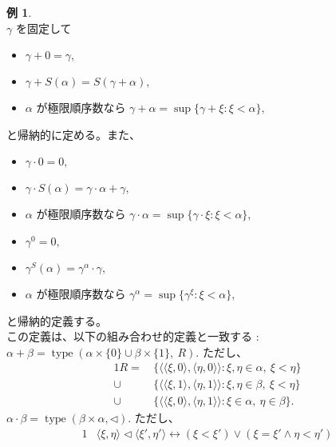 \documentclass{jsarticle}
\theoremstyle{definition}
\newtheorem{example}{例}[section]
\begin{document}
    \begin{example} \ \\
        $\gamma$ を固定して
        \begin{itemize}
        \item $\gamma + 0 = \gamma,$
        \item $\gamma + S(\alpha) = S(\gamma + \alpha),$
        \item $\alpha$ が極限順序数なら $\gamma + \alpha = \sup \{\gamma + \xi : \xi < \alpha\},$
        \end{itemize}
        と帰納的に定める。また、
        \begin{itemize}
        \item $\gamma \cdot 0 = 0,$
        \item $\gamma \cdot S(\alpha) = \gamma \cdot \alpha + \gamma,$
        \item $\alpha$ が極限順序数なら $\gamma \cdot \alpha = \sup \{\gamma \cdot \xi : \xi < \alpha\},$
        \end{itemize}
        \begin{itemize}
        \item $\gamma^0 = 0,$
        \item $\gamma^S(\alpha) = \gamma^\alpha \cdot \gamma,$
        \item $\alpha$ が極限順序数なら $\gamma^\alpha = \sup \{\gamma^\xi : \xi < \alpha\},$
        \end{itemize}
        と帰納的定義する。\\
        この定義は、以下の組み合わせ的定義と一致する : \\
        $\alpha + \beta = \operatorname{type}(\alpha \times \{0\} \cup \beta \times \{1\}, \ R).$ ただし、
        \begin{alignat*}{1}
            R = \, & \{\langle \langle \xi, 0 \rangle, \langle \eta, 0 \rangle \rangle : \xi, \eta \in \alpha, \ \xi < \eta\}\\
            \cup \,& \{\langle \langle \xi, 1 \rangle, \langle \eta, 1 \rangle \rangle : \xi, \eta \in \beta, \ \xi < \eta\}\\
            \cup \, & \{\langle \langle \xi, 0 \rangle, \langle \eta, 1 \rangle \rangle : \xi \in \alpha, \ \eta \in \beta\}.
        \end{alignat*}
        $\alpha \cdot \beta = \operatorname{type}(\beta \times \alpha, \lhd).$ ただし、
        \begin{alignat*}{1}
            &\langle \xi, \eta \rangle \lhd \langle \xi', \eta' \rangle \leftrightarrow (\xi < \xi') \lor (\xi = \xi' \land \eta < \eta')
        \end{alignat*}
    \end{example}
    
\end{document}
